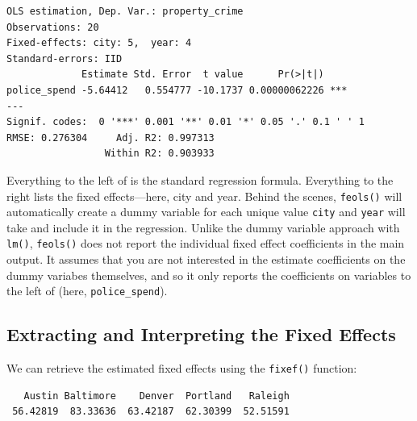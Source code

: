 \documentclass[
  letterpaper,
  DIV=11,
  numbers=noendperiod]{scrreprt}
\newenvironment{Shaded}{\begin{snugshade}}{\end{snugshade}}
\newcommand{\FunctionTok}[1]{\textcolor[rgb]{0.28,0.35,0.67}{#1}}
\newcommand{\NormalTok}[1]{\textcolor[rgb]{0.00,0.23,0.31}{#1}}
\newcommand{\OtherTok}[1]{\textcolor[rgb]{0.00,0.23,0.31}{#1}}
\newcommand{\SpecialCharTok}[1]{\textcolor[rgb]{0.37,0.37,0.37}{#1}}
\begin{document}
\begin{verbatim}
OLS estimation, Dep. Var.: property_crime
Observations: 20
Fixed-effects: city: 5,  year: 4
Standard-errors: IID 
             Estimate Std. Error  t value      Pr(>|t|)    
police_spend -5.64412   0.554777 -10.1737 0.00000062226 ***
---
Signif. codes:  0 '***' 0.001 '**' 0.01 '*' 0.05 '.' 0.1 ' ' 1
RMSE: 0.276304     Adj. R2: 0.997313
                 Within R2: 0.903933
\end{verbatim}

Everything to the left of \texttt{\textbar{}} is the standard regression
formula. Everything to the right lists the fixed effects---here, city
and year. Behind the scenes, \texttt{feols()} will automatically create
a dummy variable for each unique value \texttt{city} and \texttt{year}
will take and include it in the regression. Unlike the dummy variable
approach with \texttt{lm()}, \texttt{feols()} does not report the
individual fixed effect coefficients in the main output. It assumes that
you are not interested in the estimate coefficients on the dummy
variabes themselves, and so it only reports the coefficients on
variables to the left of \texttt{\textbar{}} (here,
\texttt{police\_spend}).

\subsection{Extracting and Interpreting the Fixed
Effects}\label{extracting-and-interpreting-the-fixed-effects}

We can retrieve the estimated fixed effects using the \texttt{fixef()}
function:

\begin{Shaded}
\end{Shaded}

\begin{verbatim}
   Austin Baltimore    Denver  Portland   Raleigh 
 56.42819  83.33636  63.42187  62.30399  52.51591 
\end{verbatim}

\begin{Shaded}
\end{Shaded}
\end{document}

